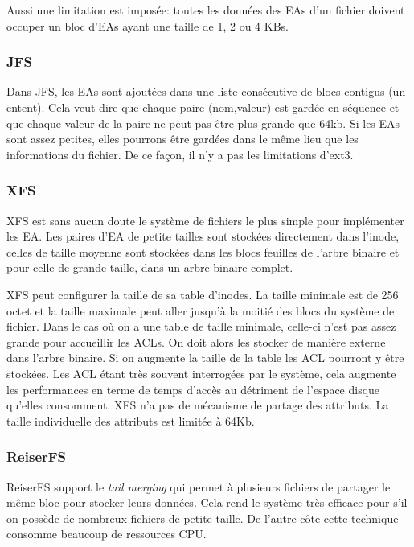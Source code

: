 Aussi une limitation est imposée: toutes les données des EAs d'un fichier doivent occuper un bloc d'EAs ayant une taille de 1, 2 ou 4 KBs.
 
 
\subsubsection*{JFS}
 
Dans JFS, les EAs sont ajoutées dans une liste consécutive de blocs contigus (un entent).  Cela veut dire que chaque paire (nom,valeur) est gardée en séquence et que chaque valeur de la paire ne peut pas être plus grande que 64kb. Si les EAs sont assez petites, elles pourrons être gardées dans le même lieu que les informations du fichier. De ce façon, il n'y a pas les limitations d'ext3.
 
\subsubsection*{XFS}
XFS est sans aucun doute le système de fichiers le plus simple pour implémenter les EA. Les paires d'EA de petite tailles sont stockées directement dans l'inode, celles de taille moyenne sont stockées dans les blocs feuilles de l'arbre binaire et pour celle de grande taille, dans un arbre binaire complet.

XFS peut configurer la taille de sa table d'inodes. La taille minimale est de 256 octet et la taille maximale peut aller jusqu'à la moitié des blocs du système de fichier. Dans le cas où on a une table de taille minimale, celle-ci n'est pas assez grande pour accueillir les ACLs. On doit alors les stocker de manière externe dans l'arbre binaire. Si on augmente la taille de la table les ACL pourront y être stockées. Les ACL étant très souvent interrogées par le système, cela augmente les performances en terme de temps d'accès au détriment de l'espace disque qu'elles consomment.
XFS n'a pas de mécanisme de partage des attributs. La taille individuelle des attributs est limitée à 64Kb.
 
\subsubsection*{ReiserFS}

ReiserFS support le \emph{tail merging} qui permet à plusieurs fichiers de partager le même bloc pour stocker leurs données. Cela rend le système très efficace pour s'il on possède de nombreux fichiers de petite taille. De l'autre côte cette technique consomme beaucoup de ressources CPU. 

